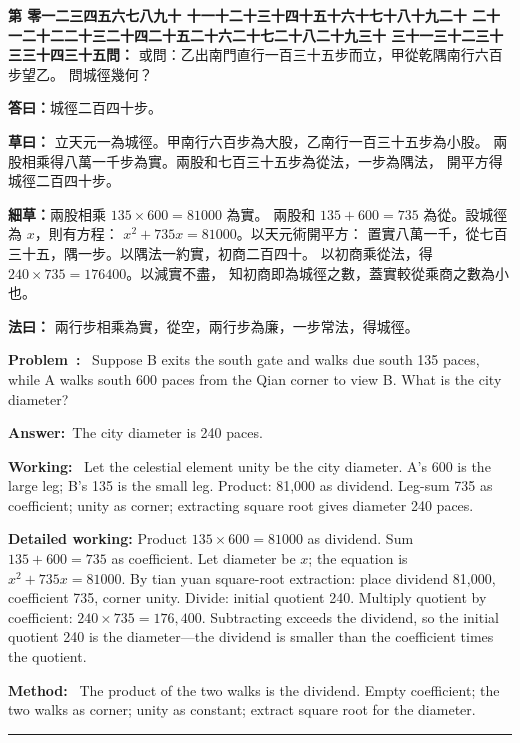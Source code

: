 \documentclass[9pt,a4paper]{article}
\newcounter{probnum}
\newcounter{overallnum}
\newcommand{\chnum}[1]{%
  \ifcase#1 零\or 一\or 二\or 三\or 四\or 五\or 六\or 七\or 八\or 九\or 十\or
    十一\or 十二\or 十三\or 十四\or 十五\or 十六\or 十七\or 十八\or 十九\or 二十\or
    二十一\or 二十二\or 二十三\or 二十四\or 二十五\or 二十六\or 二十七\or 二十八\or 二十九\or 三十\or
    三十一\or 三十二\or 三十三\or 三十四\or 三十五\fi}
\newcommand{\problem}[1]{\stepcounter{probnum}\stepcounter{overallnum}\par\noindent\textbf{\color{volcolor}第\chnum{\value{probnum}}問：}#1\par\vspace{0.15cm}}
\newcommand{\answer}[1]{\par\noindent\textbf{答曰：}#1\par\vspace{0.15cm}}
\newcommand{\working}[1]{\par\noindent\textbf{草曰：}#1\par\vspace{0.15cm}}
\newcommand{\method}[1]{\par\noindent\textbf{法曰：}#1\par\vspace{0.25cm}}
\newcommand{\eproblem}[1]{\par\noindent\textbf{\color{volcolor}Problem~\theoverallnum:}~#1\par\vspace{0.15cm}}
\newcommand{\eanswer}[1]{\par\noindent\textbf{Answer:}~#1\par\vspace{0.15cm}}
\newcommand{\eworking}[1]{\par\noindent\textbf{Working:}~#1\par\vspace{0.15cm}}
\newcommand{\emethod}[1]{\par\noindent\textbf{Method:}~#1\par\vspace{0.25cm}}
\begin{document}
\noindent\begin{minipage}[t]{0.48\textwidth}
\problem{
或問：乙出南門直行一百三十五步而立，甲從乾隅南行六百步望乙。
問城徑幾何？
}

\answer{城徑二百四十步。}

\working{
立天元一為城徑。甲南行六百步為大股，乙南行一百三十五步為小股。
兩股相乘得八萬一千步為實。兩股和七百三十五步為從法，一步為隅法，
開平方得城徑二百四十步。

\textbf{細草：}兩股相乘 $135 \times 600 = 81000$ 為實。
兩股和 $135 + 600 = 735$ 為從。設城徑為 $x$，則有方程：
$x^2 + 735x = 81000$。以天元術開平方：
置實八萬一千，從七百三十五，隅一步。以隅法一約實，初商二百四十。
以初商乘從法，得 $240 \times 735 = 176400$。以減實不盡，
知初商即為城徑之數，蓋實較從乘商之數為小也。
}

\method{
兩行步相乘為實，從空，兩行步為廉，一步常法，得城徑。
}
\end{minipage}%
\hfill%
\begin{minipage}[t]{0.50\textwidth}
\eproblem{
Suppose B exits the south gate and walks due south 135 paces, while A walks
south 600 paces from the Qian corner to view B. What is the city diameter?
}

\eanswer{The city diameter is 240 paces.}

\eworking{
Let the celestial element unity be the city diameter. A's 600 is the large
leg; B's 135 is the small leg. Product: 81,000 as dividend. Leg-sum 735 as
coefficient; unity as corner; extracting square root gives diameter 240 paces.

\textbf{Detailed working:} Product $135 \times 600 = 81000$ as dividend.
Sum $135 + 600 = 735$ as coefficient. Let diameter be $x$; the equation is
$x^2 + 735x = 81000$. By tian yuan square-root extraction: place dividend
81,000, coefficient 735, corner unity. Divide: initial quotient 240.
Multiply quotient by coefficient: $240 \times 735 = 176{,}400$. Subtracting
exceeds the dividend, so the initial quotient 240 is the diameter---the
dividend is smaller than the coefficient times the quotient.
}

\emethod{
The product of the two walks is the dividend. Empty coefficient; the two
walks as corner; unity as constant; extract square root for the diameter.
}
\end{minipage}
\vspace{0.15cm}

\vspace{0.15cm}
\noindent\rule{\textwidth}{0.2pt}
\vspace{0.15cm}
\end{document}
